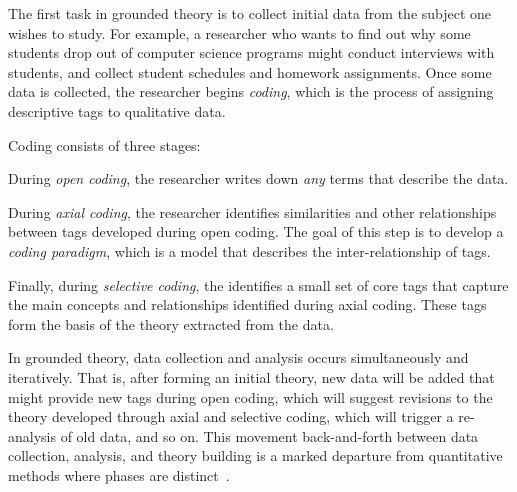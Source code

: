 \documentclass[sigconf]{acmart}
\begin{document}
The first task in grounded theory is to collect initial data from the subject
one wishes to study. For example, a researcher who wants to find out why some
students drop out of computer science programs might conduct interviews with
students, and collect student schedules and homework assignments.
%
Once some data is collected, the researcher begins \emph{coding}, which is the
process of assigning descriptive tags to qualitative data.


Coding consists of three stages:
%
\begin{enumerate*}
%
\item During \emph{open coding}, the researcher writes down \emph{any} terms
that describe the data.
%
\item During \emph{axial coding}, the researcher identifies similarities and
other relationships between tags developed during open coding. The goal of this
step is to develop a \emph{coding paradigm}, which is a model that describes
the inter-relationship of tags.
%
\item Finally, during \emph{selective coding}, the identifies a small set of
core tags that capture the main concepts and relationships identified during
axial coding. These tags form the basis of the theory extracted from the data.
%
\end{enumerate*}


In grounded theory, data collection and analysis occurs simultaneously and
iteratively. That is, after forming an initial theory, new data will be added
that might provide new tags during open coding, which will suggest revisions to
the theory developed through axial and selective coding, which will trigger a
re-analysis of old data, and so on.
%
This movement back-and-forth between data collection, analysis, and theory
building is a marked departure from quantitative methods where phases are
distinct~\cite{Strauss67discoveryof}.
\end{document}
